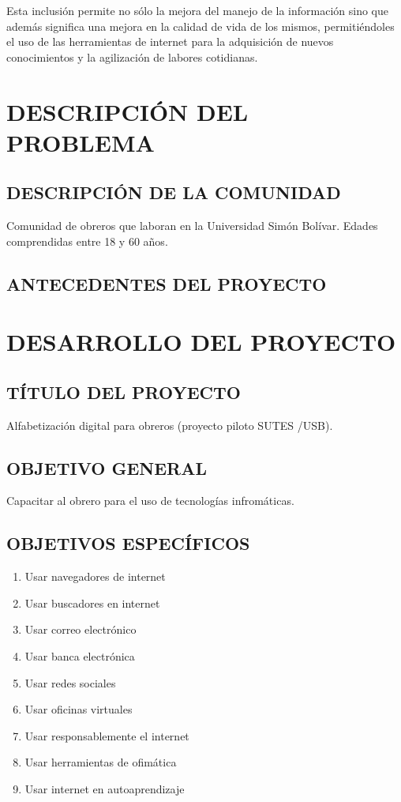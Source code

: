 \documentclass[letterpaper,12pt]{article}
\begin{document}
        Esta inclusión permite no sólo la mejora del manejo de la información sino que además significa una mejora en la calidad de vida de los mismos, permitiéndoles el uso de las herramientas de internet para la adquisición de nuevos conocimientos y la agilización de labores cotidianas.
	\pagebreak
	
	\section{DESCRIPCIÓN DEL PROBLEMA}
		\subsection{DESCRIPCIÓN DE LA COMUNIDAD}
			Comunidad de obreros que laboran en la Universidad Simón Bolívar. Edades comprendidas entre 18 y 60 años.
            
		\subsection{ANTECEDENTES DEL PROYECTO}
	\pagebreak
	
	\section{DESARROLLO DEL PROYECTO}

        \subsection{TÍTULO DEL PROYECTO}
            Alfabetización digital para obreros (proyecto piloto SUTES /USB).
        \subsection{OBJETIVO GENERAL}
            Capacitar al obrero para el uso de tecnologías infromáticas.
            
        \subsection{OBJETIVOS ESPECÍFICOS}
            \begin{enumerate}
                \item Usar navegadores de internet
                \item Usar buscadores en internet
                \item Usar correo electrónico
                \item Usar banca electrónica
                \item Usar redes sociales
                \item Usar oficinas virtuales
                \item Usar responsablemente el internet
                \item Usar herramientas de ofimática
                \item Usar internet en autoaprendizaje
            \end{enumerate}
\end{document}
